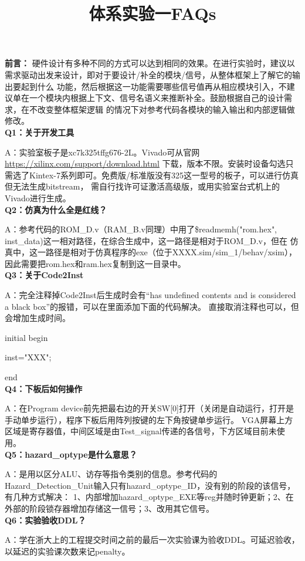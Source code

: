 \documentclass{article}
\title{\textbf{体系实验一FAQs}\vspace{-2em}}
\author{}
\date{}
\begin{document}
\maketitle

\textbf{前言：}
硬件设计有多种不同的方式可以达到相同的效果。在进行实验时，建议以需求驱动出发来设计，即对于要设计/补全的模块/信号，从整体框架上了解它的输出要起到什么
功能，然后根据这一功能需要哪些信号值再从相应模块引入，不建议单在一个模块内根据上下文、信号名语义来推断补全。鼓励根据自己的设计需求，在不改变整体框架逻辑
的情况下对参考代码各模块的输入输出和内部逻辑做修改。\\


\textbf{Q1：关于开发工具}

A：实验室板子是xc7k325tffg676-2L。Vivado可从官网\href{https://xilinx.com/support/download.html}{https://xilinx.com/support/download.html}
下载，版本不限。安装时设备勾选只需选了Kintex-7系列即可。免费版/标准版没有325这一型号的板子，可以进行仿真但无法生成bitstream，
需自行找许可证激活高级版，或用实验室台式机上的Vivado进行生成。\\


\textbf{Q2：仿真为什么全是红线？}

A：参考代码的ROM\_D.v（RAM\_B.v同理）中用了\$readmemh("rom.hex", inst\_data)这一相对路径，在综合生成中，这一路径是相对于ROM\_D.v，但在
仿真中，这一路径是相对于仿真程序的exe（位于XXXX.sim/sim\_1/behav/xsim），因此需要把rom.hex和ram.hex复制到这一目录中。\\


\textbf{Q3：关于Code2Inst}

A：完全注释掉Code2Inst后生成时会有“has undefined contents and is considered a black box”的报错，可以在里面添加下面的代码解决。
直接取消注释也可以，但会增加生成时间。

initial begin

\indent\indent inst="XXX";

end\\


\textbf{Q4：下板后如何操作}

A：在Program device前先把最右边的开关SW[0]打开（关闭是自动运行，打开是手动单步运行），程序下板后用阵列按键的左下角按键单步运行。
VGA屏幕上方区域是寄存器值，中间区域是由Test\_signal传递的各信号，下方区域目前未使用。\\


\textbf{Q5：hazard\_optype是什么意思？}

A：是用以区分ALU、访存等指令类别的信息。参考代码的Hazard\_Detection\_Unit输入只有hazard\_optype\_ID，没有别的阶段的该信号，有几种方式解决：
1、内部增加hazard\_optype\_EXE等reg并随时钟更新；2、在外部的阶段锁存器增加存储这一信号；3、改用其它信号。\\



\textbf{Q6：实验验收DDL？}

A：学在浙大上的工程提交时间之前的最后一次实验课为验收DDL。可延迟验收，以延迟的实验课次数来记penalty。
\end{document}
